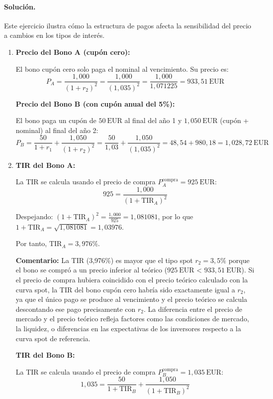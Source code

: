 \documentclass[12pt,a4paper]{article}
\newcommand{\EUR}[1]{\ensuremath{#1~\text{EUR}}}
\newenvironment{solucion}{\paragraph{Solución.}}{}
\begin{document}
 \begin{solucion}
 Este ejercicio ilustra cómo la estructura de pagos afecta la sensibilidad del precio a cambios en los tipos de interés.
 \begin{enumerate}[label=\alph*)]
   \item \textbf{Precio del Bono A (cupón cero):}
   
   El bono cupón cero solo paga el nominal al vencimiento. Su precio es:
   \[
   P_A = \frac{1{,}000}{(1+r_2)^2} = \frac{1{,}000}{(1{,}035)^2} = \frac{1{,}000}{1{,}071225} = \EUR{933{,}51}
   \]
   
   \textbf{Precio del Bono B (con cupón anual del 5\%):}
   
   El bono paga un cupón de \EUR{50} al final del año 1 y \EUR{1{,}050} (cupón + nominal) al final del año 2:
   \[
   P_B = \frac{50}{1+r_1} + \frac{1{,}050}{(1+r_2)^2} = \frac{50}{1{,}03} + \frac{1{,}050}{(1{,}035)^2} = 48{,}54 + 980{,}18 = \EUR{1{,}028{,}72}
   \]
   
   \item \textbf{TIR del Bono A:}
   
   La TIR se calcula usando el precio de compra \(P_A^{\text{compra}} = \EUR{925}\):
   \[
   925 = \frac{1{,}000}{(1+\text{TIR}_A)^2}
   \]
   
   Despejando: \((1+\text{TIR}_A)^2 = \frac{1{,}000}{925} = 1{,}081081\), por lo que \(1+\text{TIR}_A = \sqrt{1{,}081081} = 1{,}03976\).
   
   Por tanto, \(\text{TIR}_A = 3{,}976\%\). 
   
   \textbf{Comentario:} La TIR (3{,}976\%) es mayor que el tipo spot \(r_2 = 3{,}5\%\) porque el bono se compró a un precio inferior al teórico (\EUR{925} < \EUR{933{,}51}). Si el precio de compra hubiera coincidido con el precio teórico calculado con la curva spot, la TIR del bono cupón cero habría sido exactamente igual a \(r_2\), ya que el único pago se produce al vencimiento y el precio teórico se calcula descontando ese pago precisamente con \(r_2\). La diferencia entre el precio de mercado y el precio teórico refleja factores como las condiciones de mercado, la liquidez, o diferencias en las expectativas de los inversores respecto a la curva spot de referencia.
   
   \textbf{TIR del Bono B:}
   
   La TIR se calcula usando el precio de compra \(P_B^{\text{compra}} = \EUR{1{,}035}\):
   \[
   1{,}035 = \frac{50}{1+\text{TIR}_B} + \frac{1{,}050}{(1+\text{TIR}_B)^2}
   \]
   

\end{enumerate}
\end{solucion}
\end{document}

